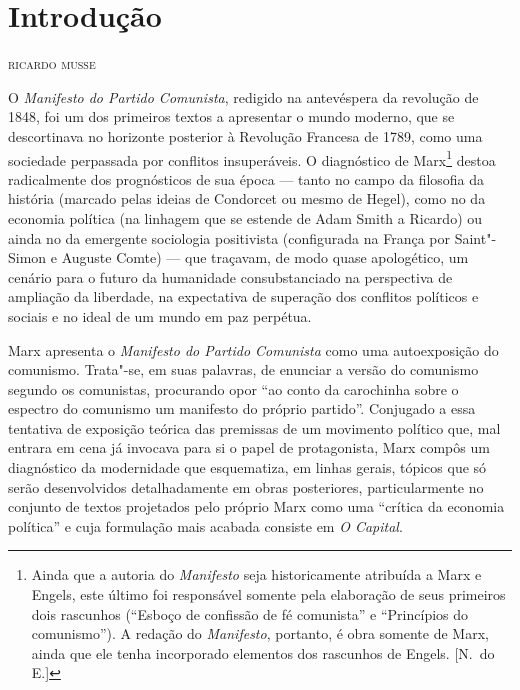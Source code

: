 \pagestyle{plain}


\chapter[Introdução, por Ricardo Musse]{Introdução}

\begin{flushright}
\textsc{ricardo musse}
\end{flushright}

\noindent{}O \textit{Manifesto do Partido Comunista}, redigido na antevéspera da
revolução de 1848, foi um dos primeiros textos a apresentar o mundo
moderno, que se descortinava no horizonte posterior à Revolução
Francesa de 1789, como uma sociedade perpassada por conflitos
insuperáveis. O diagnóstico de Marx\footnote{ Ainda que a autoria do \textit{Manifesto} 
seja historicamente atribuída a Marx e Engels, este último foi responsável somente pela 
elaboração de seus primeiros dois rascunhos (“Esboço de confissão de fé comunista” e “Princípios do comunismo”). 
A redação do \textit{Manifesto}, portanto, é obra somente de Marx, ainda que ele tenha incorporado 
elementos dos rascunhos de Engels. [N.~do E.]} destoa radicalmente dos
prognósticos de sua época --- tanto no campo da filosofia da história
(marcado pelas ideias de Condorcet ou mesmo de Hegel), como no da
economia política (na linhagem que se estende de Adam Smith a Ricardo)
ou ainda no da emergente sociologia positivista (configurada na França
por Saint"-Simon e Auguste Comte) --- que traçavam, de modo quase
apologético, um cenário para o futuro da humanidade consubstanciado na
perspectiva de ampliação da liberdade, na expectativa de superação dos
conflitos políticos e sociais e no ideal de um mundo em paz perpétua.

Marx apresenta o \textit{Manifesto do Partido Comunista} como uma
autoexposição do comunismo. Trata"-se, em suas palavras, de
enunciar a versão do comunismo segundo os comunistas, procurando opor
“ao conto da carochinha sobre o espectro do comunismo um manifesto do próprio partido”.
Conjugado a essa tentativa de exposição teórica das premissas de um
movimento político que, mal entrara em cena já invocava para si o papel
de protagonista, Marx compôs um diagnóstico da modernidade que
esquematiza, em linhas gerais, tópicos que só serão desenvolvidos
detalhadamente em obras posteriores, particularmente no conjunto de
textos projetados pelo próprio Marx como uma “crítica da economia
política” e cuja formulação mais acabada consiste em \textit{O
Capital}.

